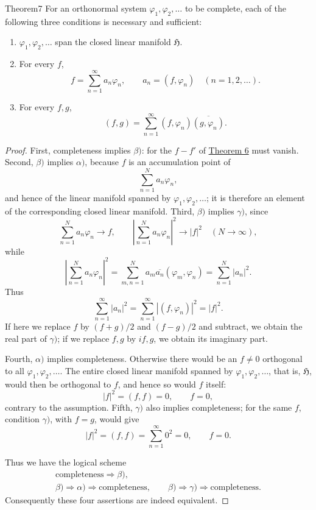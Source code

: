﻿\documentclass[paper=b5,fontsize=13pt,bookmarkpackage=false,twoside]{scrartcl}
\begin{document}
\begin{namedstatement}{Theorem}{7}\label{thm:7}
For an orthonormal system $\varphi_1,\varphi_2,\ldots$ to be complete, each of the following three conditions is necessary and sufficient:

\begin{enumerate}
\renewcommand{\labelenumi}{$\alpha)$}
\item\label{cond:thm7-alpha}
$\varphi_1,\varphi_2,\ldots$ span the closed linear manifold $\mathfrak H$.

\renewcommand{\labelenumi}{$\beta)$}
\item\label{cond:thm7-beta}
For every $f$,
\[
 f=\sum_{n=1}^{\infty}a_n\varphi_n,
 \qquad
 a_n=(f,\varphi_n)
 \quad(n=1,2,\ldots).
\]

\renewcommand{\labelenumi}{$\gamma)$}
\item\label{cond:thm7-gamma}
For every $f,g$,
\[
 (f,g)
 =
 \sum_{n=1}^{\infty}
 (f,\varphi_n)\overline{(g,\varphi_n)}.
\]
\end{enumerate}
\end{namedstatement}

\begin{proof}
First, completeness implies $\beta)$: for the $f-f'$ of \hyperref[thm:6]{Theorem 6} must vanish. Second, $\beta)$ implies $\alpha)$, because $f$ is an accumulation point of
\[
 \sum_{n=1}^{N}a_n\varphi_n,
\]
and hence of the linear manifold spanned by $\varphi_1,\varphi_2,\ldots$; it is therefore an element of the corresponding closed linear manifold. Third, $\beta)$ implies $\gamma)$, since
\[
 \sum_{n=1}^{N}a_n\varphi_n\longrightarrow f,
 \qquad
 \left|\sum_{n=1}^{N}a_n\varphi_n\right|^2\longrightarrow|f|^2
 \quad(N\to\infty),
\]
while
\[
 \left|\sum_{n=1}^{N}a_n\varphi_n\right|^2
 =
 \sum_{m,n=1}^{N}a_m\overline{a_n}(\varphi_m,\varphi_n)
 =
 \sum_{n=1}^{N}|a_n|^2.
\]
Thus
\[
 \sum_{n=1}^{\infty}|a_n|^2
 =
 \sum_{n=1}^{\infty}|(f,\varphi_n)|^2
 =
 |f|^2.
\]
If here we replace $f$ by $(f+g)/2$ and $(f-g)/2$ and subtract, we obtain the real part of $\gamma)$; if we replace $f,g$ by $if,g$, we obtain its imaginary part.

Fourth, $\alpha)$ implies completeness. Otherwise there would be an $f\ne0$ orthogonal to all $\varphi_1,\varphi_2,\ldots$. The entire closed linear manifold spanned by $\varphi_1,\varphi_2,\ldots$, that is, $\mathfrak H$, would then be orthogonal to $f$, and hence so would $f$ itself:
\[
 |f|^2=(f,f)=0,\qquad f=0,
\]
contrary to the assumption. Fifth, $\gamma)$ also implies completeness; for the same $f$, condition $\gamma)$, with $f=g$, would give
\[
 |f|^2=(f,f)=\sum_{n=1}^{\infty}0^2=0,
 \qquad f=0.
\]

Thus we have the logical scheme
\[
\begin{gathered}
\text{completeness}\Longrightarrow\beta),\\
\beta)\Longrightarrow\alpha)\Longrightarrow\text{completeness},
\qquad
\beta)\Longrightarrow\gamma)\Longrightarrow\text{completeness}.
\end{gathered}
\]
Consequently these four assertions are indeed equivalent.
\end{proof}
\end{document}
